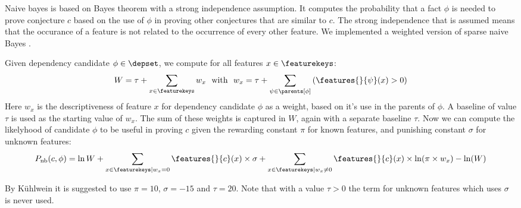 Naive bayes \cite{roth1998learning} is based on Bayes theorem with a strong independence assumption.
It computes the probability that a fact $\phi$ is needed to prove conjecture $c$ based on the use of $\phi$ in proving other conjectures that are similar to $c$.
The strong independence that is assumed means that the occurance of a feature is not related to the occurrence of every other feature.
We implemented a weighted version of sparse naive Bayes \cite{kuhlwein2013mash}.

Given dependency candidate $\phi \in \depset$, we compute for all features $x \in \featurekeys$:
\[
  W = \tau + \sum_{x \in \featurekeys} w_x ~~\text{with}~~ w_x = \tau + \sum_{\psi \in \parents[\phi]} \left( \features{}{\psi}(x) > 0 \right)
\]
Here $w_x$ is the descriptiveness of feature $x$ for dependency candidate $\phi$ as a weight, based on it's use in the parents of $\phi$.
A baseline of value $\tau$ is used as the starting value of $w_x$.
The sum of these weights is captured in $W$, again with a separate baseline $\tau$.
Now we can compute the likelyhood of candidate $\phi$ to be useful in proving $c$ given the rewarding constant $\pi$ for known features, and punishing constant $\sigma$ for unknown features:
\[
	P_\text{nb}(c, \phi) = \ln W +
  \sum_{x \in \featurekeys | w_x = 0} \features{}{c}(x) \times \sigma +
  \sum_{x \in \featurekeys | w_x \neq 0} \features{}{c}(x) \times \ln(\pi \times w_x) - \ln(W)
\]

By K\"uhlwein \cite{kuhlwein2013mash} it is suggested to use $\pi = 10$, $\sigma = -15$ and $\tau = 20$.
Note that with a value $\tau > 0$ the term for unknown features which uses $\sigma$ is never used.